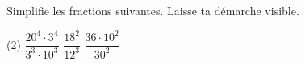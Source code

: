 %
%
Simplifie les fractions suivantes. Laisse ta démarche visible.
	\begin{tasks} (2)
		\task $\dfrac{20^4\cdot 3^4}{3^3\cdot 10^3}$
		\task $\dfrac{18^2}{12^3}$
		\task $\dfrac{36\cdot 10^2}{30^2}$
	\end{tasks}
